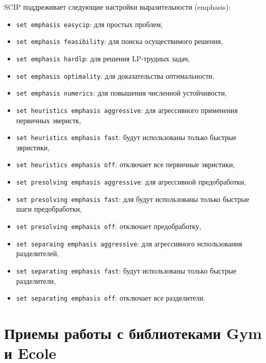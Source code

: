 \documentclass[%
	11pt,
	a4paper,
	utf8,
		]{article}
\begin{document}
SCIP поддреживает следующие настройки выразительности (emphasis):
\begin{itemize}
	\item \texttt{set emphasis easycip}: для простых проблем,
	
	\item \texttt{set emphasis feasibility}: для поиска осуществимого решения,
	
	\item \texttt{set emphasis hardlp}: для решения LP-трудных задач,
	
	\item \texttt{set emphasis optimality}: для доказательства оптимальности,
	
	\item \texttt{set emphasis numerics}: для повышения численной устойчивости,
	
	\item \texttt{set heuristics emphasis aggressive}: для агрессивного применения первичных эверистк,
	
	\item \texttt{set heuristics emphasis fast}: будут использованы только быстрые эвристики,
	
	\item \texttt{set heuristics emphasis off}: отключает все первичные эвристики,
	
	\item \texttt{set presolving emphasis aggressive}: для агрессивной предобработки,
	
	\item \texttt{set presolving emphasis fast}: для будут использованы только быстрые шаги предобработки,
	
	\item \texttt{set presolving emphasis off}: отключает предобработку,
	
	\item \texttt{set separaing emphasis aggressive}: для агрессивного использования разделителей,
	
	\item \texttt{set separating emphasis fast}: будут использованы только быстрые разделители,
	
	\item \texttt{set separating emphasis off}: отключает все разделители.
\end{itemize}




\section{Приемы работы с библиотеками Gym и Ecole}
\end{document}

